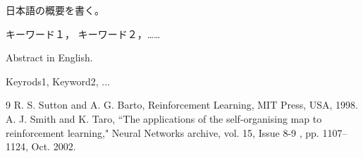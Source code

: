 \documentclass[openany,11pt,papersize,dvipdfm,uplatex]{jsbook}
\begin{document}
\maketitle

\frontmatter

\begin{jabstract} 
日本語の概要を書く。
\begin{jkeyword}
キーワード１， キーワード２，……
\end{jkeyword}
\end{jabstract}

\begin{eabstract} Abstract in English. 
\begin{ekeyword}
Keyrods1, Keyword2, ...
\end{ekeyword}
\end{eabstract}

\tableofcontents%

\mainmatter



\begin{thebibliography}{9}
 R. S. Sutton and A. G. Barto, Reinforcement Learning, MIT Press, USA, 1998.
 A. J. Smith and K. Taro, ``The applications of the self-organising map to reinforcement learning," Neural Networks archive, vol. 15, Issue 8-9 , pp. 1107--1124,  Oct. 2002.
\end{thebibliography}
\begin{appendix}


\end{appendix}
\end{document}
